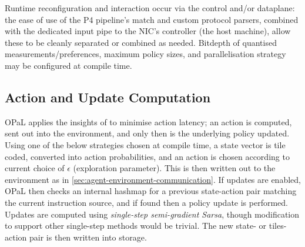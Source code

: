 \documentclass[sigconf,natbib=false]{acmart}
\newcommand{\approachshort}{OPaL}
\begin{document}
Runtime reconfiguration and interaction occur via the control and/or dataplane: the ease of use of the P4 pipeline's match and custom protocol parsers, combined with the dedicated input pipe to the NIC's controller (the host machine), allow these to be cleanly separated or combined as needed.
Bitdepth of quantised measurements/preferences, maximum policy sizes, and parallelisation strategy may be configured at compile time.

\subsection{Action and Update Computation}
\approachshort{} applies the insights of \textcite{DBLP:journals/firai/TravnikMSP18} to minimise action latency; an action is computed, sent out into the environment, and only then is the underlying policy updated.
Using one of the below strategies chosen at compile time, a state vector is tile coded, converted into action probabilities, and an action is chosen according to current choice of $\epsilon$ (exploration parameter).
This is then written out to the environment as in \cref{sec:agent-environment-communication}.
If updates are enabled, \approachshort{} then checks an internal hashmap for a previous state-action pair matching the current instruction source, and if found then a policy update is performed.
Updates are computed using \emph{single-step semi-gradient Sarsa}, though modification to support other single-step methods would be trivial.
The new state- or tiles-action pair is then written into storage.
\end{document}
